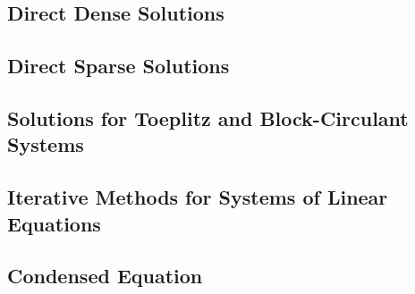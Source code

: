 \subsection{Direct Dense Solutions}


\subsection{Direct Sparse Solutions}


\subsection{Solutions for Toeplitz and Block-Circulant Systems}


\subsection{Iterative Methods for Systems of Linear Equations}


\subsection{Condensed Equation}

